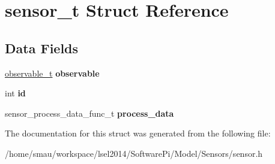 \hypertarget{structsensor__t}{\section{sensor\-\_\-t Struct Reference}
\label{structsensor__t}
}
\subsection*{Data Fields}
\begin{DoxyCompactItemize}
\item 
\hypertarget{structsensor__t_ae7b320ee91c6bfc4fd02fcb74a62319d}{\hyperlink{structobservable__t}{observable\-\_\-t} {\bfseries observable}}\label{structsensor__t_ae7b320ee91c6bfc4fd02fcb74a62319d}

\item 
\hypertarget{structsensor__t_a3560087df4ddd8409661246177be43f5}{int {\bfseries id}}\label{structsensor__t_a3560087df4ddd8409661246177be43f5}

\item 
\hypertarget{structsensor__t_a072a1c3839170ad7bdca52b673451cd5}{sensor\-\_\-process\-\_\-data\-\_\-func\-\_\-t {\bfseries process\-\_\-data}}\label{structsensor__t_a072a1c3839170ad7bdca52b673451cd5}

\end{DoxyCompactItemize}


The documentation for this struct was generated from the following file\-:\begin{DoxyCompactItemize}
\item 
/home/smau/workspace/lsel2014/\-Software\-Pi/\-Model/\-Sensors/sensor.\-h\end{DoxyCompactItemize}
